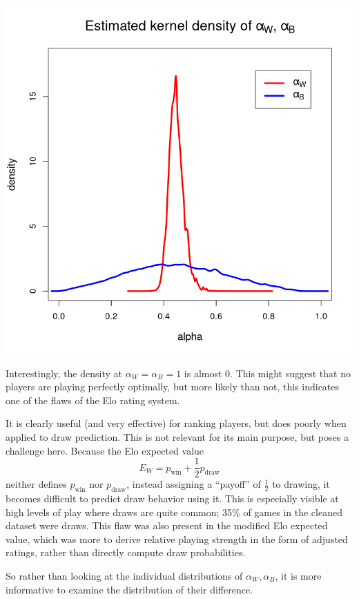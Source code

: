 \documentclass{article}
\newcommand{\pw}{p_{\text{win}}}
\newcommand{\pd}{p_{\text{draw}}}
\begin{document}
\includegraphics[width=\textwidth]{./distributions.png}

Interestingly, the density at $\alpha_W=\alpha_B=1$ is almost $0$.
This might suggest that no players are playing perfectly optimally, but more likely than not,
this indicates one of the flaws of the Elo rating system.

It is clearly useful (and very effective) for ranking players, but does poorly when applied
to draw prediction. This is not relevant for its main purpose, but poses a challenge here.
Because the Elo expected value $$E_W=\pw + \frac{1}{2}\pd$$
neither defines $\pw$ nor $\pd$, instead assigning a ``payoff'' of $\frac{1}{2}$ to drawing,
it becomes difficult to predict draw behavior using it.
This is especially visible at high levels of play where draws are quite common;
35\% of games in the cleaned dataset were draws.
This flaw was also present in the
modified Elo expected value, which was more to
derive relative playing strength in the form of adjusted ratings, rather than directly compute draw probabilities.

So rather than looking at the individual distributions of $\alpha_W,\alpha_B$, it is more informative to examine
the distribution of their difference.
\end{document}
